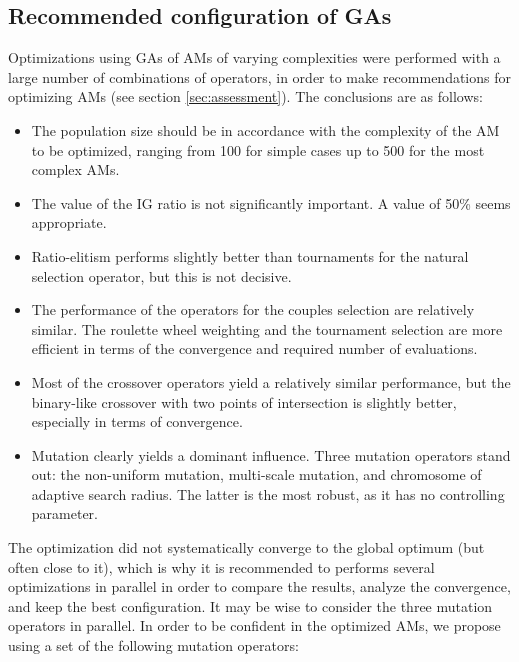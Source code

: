 \documentclass{ametsoc}
\begin{document}
\subsection{Recommended configuration of GAs}
\label{sec:recommendations}

Optimizations using GAs of AMs of varying complexities were performed with a large number of combinations of operators, in order to make recommendations for optimizing AMs (see section \ref{sec:assessment}). The conclusions are as follows:

\begin{itemize}
	\item The population size should be in accordance with the complexity of the AM to be optimized, ranging from 100 for simple cases up to 500 for the most complex AMs.
	
	\item The value of the IG ratio is not significantly important. A value of 50\% seems appropriate.
	
	\item Ratio-elitism performs slightly better than tournaments for the natural selection operator, but this is not decisive.
	
	\item The performance of the operators for the couples selection are relatively similar. The roulette wheel weighting and the tournament selection are more efficient in terms of the convergence and required number of evaluations.
	
	\item Most of the crossover operators yield a relatively similar performance, but the binary-like crossover with two points of intersection is slightly better, especially in terms of convergence.
	
	\item Mutation clearly yields a dominant influence. Three mutation operators stand out: the non-uniform mutation, multi-scale mutation, and chromosome of adaptive search radius. The latter is the most robust, as it has no controlling parameter.
	
\end{itemize}

The optimization did not systematically converge to the global optimum (but often close to it), which is why it is recommended to performs several optimizations in parallel in order to compare the results, analyze the convergence, and keep the best configuration. It may be wise to consider the three mutation operators in parallel. In order to be confident in the optimized AMs, we propose using a set of the following mutation operators:
\end{document}

